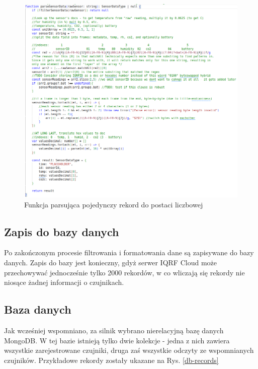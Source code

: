 \begin{figure}[H]
    \includegraphics[width=\textwidth]{zdj/app/parse-sensor.png}
    \caption{Funkcja parsująca pojedynczy rekord do postaci liczbowej}
    \label{record-after-parsing}
\end{figure}

\subsection{Zapis do bazy danych}

Po zakończonym procesie filtrowania i formatowania dane są zapisywane do bazy danych. Zapis do bazy jest konieczny, gdyż serwer IQRF Cloud może przechowywać
jednocześnie tylko 2000 rekordów, w co wliczają się rekordy nie niosące żadnej informacji o czujnikach.

\subsection{Baza danych}
\label{ch:baza-danych}

Jak wcześniej wspomniano, za silnik wybrano nierelacyjną bazę danych MongoDB. W tej bazie istnieją tylko dwie kolekcje - jedna z nich zawiera wszystkie zarejestrowane 
czujniki, druga zaś wszystkie odczyty ze wspomnianych czujników. Przykładowe rekordy zostały ukazane na Rys. \ref{db-records}


